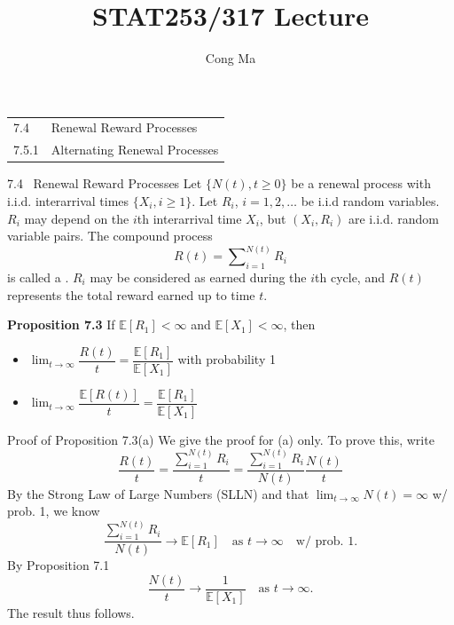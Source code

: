 \documentclass[letterpaper,handout, mathserif]{beamer}
\title{STAT253/317 Lecture \chapnum} \date{} \author{Cong Ma}
\def\Sum{\sum\nolimits}
\def\E{\mathbb E}
\begin{document}
\begin{frame}
\maketitle
\begin{center}\large
\begin{tabular}{ll}
7.4 & Renewal Reward Processes\\
7.5.1 & Alternating Renewal Processes
\end{tabular}
\end{center}
\end{frame}
\begin{frame}{7.4~ Renewal Reward Processes}
Let $\{N(t),t\ge 0\}$ be a renewal process with i.i.d. interarrival times
$\{X_i, i\ge 1\}$. Let $R_i$, $i = 1,2,\ldots$ be i.i.d random variables. $R_i$
may depend on the $i$th interarrival time $X_i$, but $(X_i,R_i)$ are i.i.d.
random variable pairs. The compound process
$$
R(t) = \Sum_{i=1}^{N(t)}R_i
$$
is called a . $R_i$ may be considered as 
earned during the $i$th cycle, and $R(t)$ represents the total reward
earned up to time $t$.\bigskip

{\bf Proposition 7.3} If $\E[R_1] < \infty$ and $\E[X_1] < \infty$, then
\begin{itemize}
\item[(a)] $\displaystyle\lim_{t\to\infty}\dfrac{R(t)}{t}=\dfrac{\E[R_1]}{\E[X_1]}$ with probability 1
\item[(b)] $\displaystyle\lim_{t\to\infty}\dfrac{\E[R(t)]}{t}=\dfrac{\E[R_1]}{\E[X_1]}$
\end{itemize}
\end{frame}
\begin{frame}{Proof of Proposition 7.3(a)}
We give the proof for (a) only. To prove this, write
$$\frac{R(t)}{t}=\frac{\Sum_{i=1}^{N(t)}R_i}{t}
=\frac{\Sum_{i=1}^{N(t)}R_i}{N(t)}\frac{N(t)}{t}$$
By the Strong Law of Large Numbers (SLLN) and that $\lim_{t\to\infty}N(t)=\infty$ w/ prob. 1,  we know
$$
\frac{\Sum_{i=1}^{N(t)}R_i}{N(t)}\to\E[R_1]\quad\text{as }t\to\infty\quad\text{w/ prob. 1}.
$$
By Proposition 7.1
$$
\frac{N(t)}{t}\to\frac{1}{\E[X_1]}\quad\text{as }t\to\infty.
$$
The result thus follows.
\end{frame}
\end{document}
